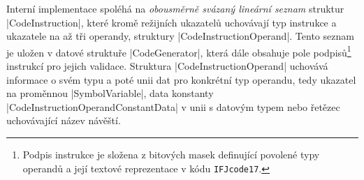 Interní implementace spoléhá na \emph{obousměrně svázaný lineární seznam} struktur \ic|CodeInstruction|, které kromě
režijních ukazatelů uchovávají typ instrukce a ukazatele na až tři operandy, struktury \ic|CodeInstructionOperand|.
Tento seznam je uložen v datové struktuře \ic|CodeGenerator|, která dále obsahuje pole podpisů\footnote{Podpis
instrukce je složena z bitových masek definující povolené typy operandů a její textové reprezentace v kódu
\texttt{IFJcode17}.} instrukcí pro jejich validace.
Struktura \ic|CodeInstructionOperand| uchovává informace o svém typu a poté unii dat pro konkrétní typ operandu, tedy
ukazatel na proměnnou \ic|SymbolVariable|,
data konstanty \ic|CodeInstructionOperandConstantData| v unii s datovým typem nebo řetězec uchovávající název návěští.